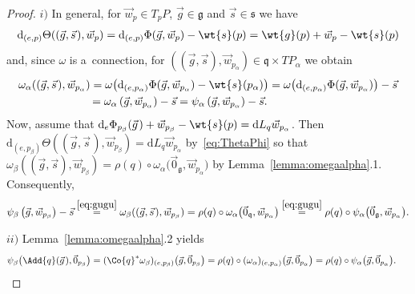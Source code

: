 \documentclass[pdftex]{sigma}
\numberwithin{equation}{section}
\begin{document}
\begin{proof}
$i)$ In general, for $\vec{w}_p\in T_pP$, $\vec{g}\in\mathfrak{g}$ and $\vec{s}\in\mathfrak{s}$ we have
\begin{gather}
\label{eq:ThetaPhi}
\mathrm{d}_{(e,p)}\Theta((\vec{g},\vec{s}\hspace{1pt}),\vec{w}_p)
=\mathrm{d}_{(e,p)}\Phi(\vec{g},\vec{w}_p)-\wt{s}(p)=\wt{g}(p)+\vec{w}_p-\wt{s}(p)
\end{gather}
and, since $\omega$ is a~connection, for $((\vec{g},\vec{s}),\vec{w}_{p_\alpha})\in \mathfrak{q}\times TP_\alpha$ we
obtain{\samepage
\begin{gather}
\begin{split}
& \omega_\alpha((\vec{g},\vec{s}\hspace{1pt}),\vec{w}_{p_\alpha})
=\omega\big(\mathrm{d}_{(e,p_\alpha)}\Phi(\vec{g},\vec{w}_{p_\alpha})-\wt{s}(p_\alpha)\big)
=\omega\big(\mathrm{d}_{(e,p_\alpha)}\Phi(\vec{g},\vec{w}_{p_\alpha})\big)-\vec{s}
\\
&\phantom{\omega_\alpha((\vec{g},\vec{s}),\vec{w}_{p_\alpha})}
=\omega_\alpha\left(\vec{g},\vec{w}_{p_\alpha}\right)-\vec{s}
=\psi_\alpha\left(\vec{g},\vec{w}_{p_\alpha}\right)-\vec{s}.
\end{split} \label{eq:gugu}
\end{gather}
Now,} assume that $\mathrm{d}_e\Phi_{p_\beta}(\vec{g}\hspace{1pt})+\vec{w}_{p_\beta}-\wt{s}(p)=\mathrm{d}
L_q\vec{w}_{p_\alpha}$.
Then $\mathrm{d}_{(e,p_\beta)}\Theta((\vec{g},\vec{s}\hspace{1pt}),\vec{w}_{p_\beta})=\mathrm{d} L_q \vec{w}_{p_\alpha}$
by~\eqref{eq:ThetaPhi} so that $\omega_\beta((\vec{g},\vec{s}),\vec{w}_{p_\beta})=\rho(q)\circ
\omega_\alpha\big(\vec{0}_{\mathfrak{g}},\vec{w}_{p_\alpha}\big)$ by Lemma~\ref{lemma:omegaalpha}.1.
Consequently,
\begin{gather*}
\psi_\beta\left(\vec{g},\vec{w}_{p_\beta}\right)-\vec{s}
\stackrel{\eqref{eq:gugu}}{=}\omega_\beta((\vec{g},\vec{s}\hspace{1pt}),\vec{w}_{p_\beta})
=\rho(q)\circ
\omega_\alpha\big(\vec{0}_\mathfrak{q},\vec{w}_{p_\alpha}\big)\stackrel{\eqref{eq:gugu}}{=}\rho(q)\circ
\psi_\alpha\big(\vec{0}_{\mathfrak{g}},\vec{w}_{p_\alpha}\big).
\end{gather*}

$ii)$ Lemma~\ref{lemma:omegaalpha}.2 yields
\begin{gather*}
\psi_\beta\big(\Add{q}(\vec{g}\hspace{1pt}),\vec{0}_{p_\beta}\big)
=(\Co{q}^{*}\omega_\beta)_{(e,p_\beta)}\big(\vec{g},\vec{0}_{p_\beta}\big)
=\rho(q)\circ (\omega_\alpha)_{(e,p_\alpha)}\big(\vec{g},\vec{0}_{p_\alpha}\big) =\rho(q)\circ
\psi_\alpha\big(\vec{g},\vec{0}_{p_\alpha}\big).\!\!\!\!\tag*{\qed}
\end{gather*}
\renewcommand{\qed}{}
\end{proof}
\end{document}
